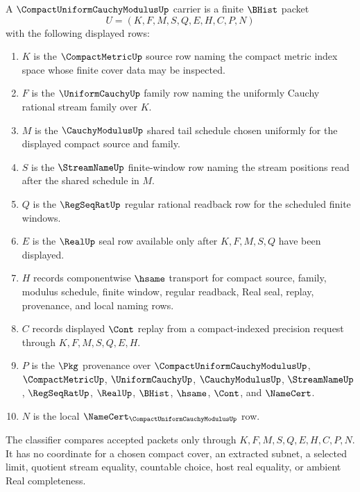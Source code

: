 \begin{definition}\label{def:compact-uniform-cauchy-modulus-carrier}
A $\CompactUniformCauchyModulusUp$ carrier is a finite $\BHist$ packet
$$
U=(K,F,M,S,Q,E,H,C,P,N)
$$
with the following displayed rows:
\begin{enumerate}
\item $K$ is the $\CompactMetricUp$ source row naming the compact metric index space whose finite cover data may be inspected.
\item $F$ is the $\UniformCauchyUp$ family row naming the uniformly Cauchy rational stream family over $K$.
\item $M$ is the $\CauchyModulusUp$ shared tail schedule chosen uniformly for the displayed compact source and family.
\item $S$ is the $\StreamNameUp$ finite-window row naming the stream positions read after the shared schedule in $M$.
\item $Q$ is the $\RegSeqRatUp$ regular rational readback row for the scheduled finite windows.
\item $E$ is the $\RealUp$ seal row available only after $K,F,M,S,Q$ have been displayed.
\item $H$ records componentwise $\hsame$ transport for compact source, family, modulus schedule, finite window, regular readback, Real seal, replay, provenance, and local naming rows.
\item $C$ records displayed $\Cont$ replay from a compact-indexed precision request through $K,F,M,S,Q,E,H$.
\item $P$ is the $\Pkg$ provenance over $\CompactUniformCauchyModulusUp$, $\CompactMetricUp$, $\UniformCauchyUp$, $\CauchyModulusUp$, $\StreamNameUp$, $\RegSeqRatUp$, $\RealUp$, $\BHist$, $\hsame$, $\Cont$, and $\NameCert$.
\item $N$ is the local $\NameCert_{\CompactUniformCauchyModulusUp}$ row.
\end{enumerate}
The classifier compares accepted packets only through $K,F,M,S,Q,E,H,C,P,N$. It has no coordinate for a chosen compact cover, an extracted subnet, a selected limit, quotient stream equality, countable choice, host real equality, or ambient Real completeness.
\end{definition}

